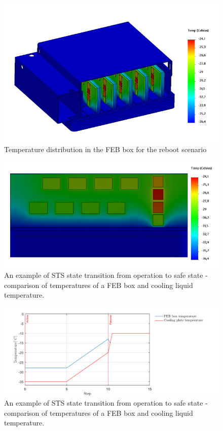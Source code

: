 \begin{figure}[!h]
\centering
\includegraphics[width=0.6\columnwidth]{Chapter3/Cycling/Images/reboot_box.png}
\caption{Temperature distribution in the \gls{FEB} box for the reboot scenario}
\label{fig_reboot_box}
\end{figure}

\begin{figure}[!h]
\centering
\includegraphics[width=0.6\columnwidth]{Chapter3/Cycling/Images/reboot_FEB.png}
\caption{An example of \gls{STS} state transition from operation to safe state - comparison of temperatures of a \gls{FEB} box and cooling liquid temperature.}
\label{fig_reboot_FEB}
\end{figure}

\begin{figure}[!h]
\centering
\includegraphics[width=0.95\columnwidth]{Chapter3/Cycling/Images/nominal.png}
\caption{An example of \gls{STS} state transition from operation to safe state - comparison of temperatures of a \gls{FEB} box and cooling liquid temperature.}
\label{fig_reboot_nominal}
\end{figure}
